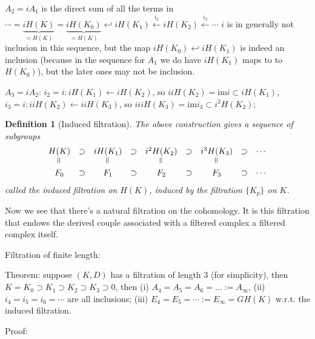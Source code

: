 \documentclass{article}
\newcommand{\verteq}{\rotatebox{90}{$\,=$}}
\theoremstyle{mystyle}
\newtheorem*{definition}{Definition}%
\theoremstyle{remark}
\numberwithin{equation}{section}
\begin{document}
$A_2 = iA_1$ is the direct sum of all the terms in $\cdots =\underbrace{iH(K)}_{=H(K)}=\underbrace{iH(K_0)}_{=H(K)}\hookleftarrow iH(K_1)\xleftarrow{i_2} iH(K_2)\xleftarrow{i_2} \cdots$
$i$ is in generally not inclusion in this sequence, but the map $iH(K_0)\hookleftarrow iH(K_1)$ is indeed an inclusion (because in the sequence for $A_1$ we do have $iH(K_1)$ maps to to $H(K_0)$), but the later ones may not be inclusion.

$A_3=iA_2$: $i_2 = i\colon iH(K_1)\leftarrow iH(K_2)$, so $iiH(K_2)=\mathrm{im}i \subset iH(K_1)$, $i_3 = i\colon iiH(K_2)\leftarrow iiH(K_3)$, so $iiiH(K_3) = \mathrm{im}i_3 \subset i^2H(K_2)$; 

\begin{definition}[Induced filtration] The above construction gives a sequence of subgroups 
\begin{equation}\label{ind_filt}
\begin{array}{ccccccccc}
{H(K)} &\supset&
{iH(K_1)} &\supset& 
{i^2H(K_2)} &\supset& 
{i^3H(K_3)} &\supset& \cdots\\
\verteq &&\verteq && \verteq && \verteq &&\\
F_0 &\supset& F_1 &\supset&  F_2 &\supset&  F_3 &\supset &\cdots
\end{array}
\end{equation}\label{ind_filt_fnt}
called the \emph{induced filtration} on $H(K)$, induced by the filtration $\{K_p\}$ on $K$.
\end{definition}

Now we see that there's a natural filtration on the cohomology. It is this filtration that endows the derived couple associated with a filtered complex a filtered complex itself.


Filtration of finite length:

Theorem: suppose $(K,D)$ has a filtration of length 3 (for simplicity), then
$K = K_0\supset K_1 \supset K_2 \supset K_3 \supset 0$, then (i) $A_4=A_5 = A_6 = ... := A_\infty$, (ii) $i_4 = i_5 = i_6 = \cdots$ are all inclusions; (iii) $E_4=E_5=\cdots :=E_\infty = GH(K)$ w.r.t. the induced filtration.

Proof: 




\end{document}
